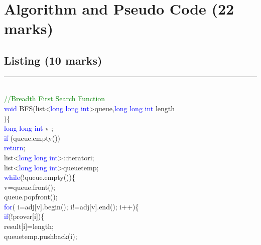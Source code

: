 \documentclass{article}
\begin{document}
\section{Algorithm and Pseudo Code (22 marks)}
\subsection{Listing (10 marks)}
{\color{black} \rule{\linewidth}{0.1mm} }
\\
\Large{
\textcolor{green}{//Breadth First Search Function}\\
\textcolor{blue}{void} BFS(list\textless\textcolor{blue}{long long int}\textgreater queue,\textcolor{blue}{long long int} length\\
\hspace*{4ex})\{\\
\hspace*{5ex}\textcolor{blue}{long long int} v ;\\
\hspace*{5ex}\textcolor{blue}{if} (queue.empty())\\
\hspace*{11ex}\textcolor{blue}{return};\\
\hspace*{5ex}list\textless\textcolor{blue}{long long int}\textgreater ::iterator\hspace*{2ex}i;\\
\hspace*{5ex}list\textless\textcolor{blue}{long long int}\textgreater \hspace*{1ex}queue\textunderscore temp;\\
\hspace*{5ex}\textcolor{blue}{while}(!queue.empty())\{\\
\hspace*{11ex}v=queue.front();\\
\hspace*{11ex}queue.pop\textunderscore front();\\
\hspace*{11ex}\textcolor{blue}{for}( i=adj[v].begin(); i!=adj[v].end(); i++)\{\\
\hspace*{16ex}\textcolor{blue}{if}(!pro\textunderscore ver[\textasteriskcentered i])\{\\
\hspace*{21ex}result[\textasteriskcentered i]=length;\\
\hspace*{21ex}queue\textunderscore temp.push\textunderscore back(\textasteriskcentered i);\\
}
\end{document}
